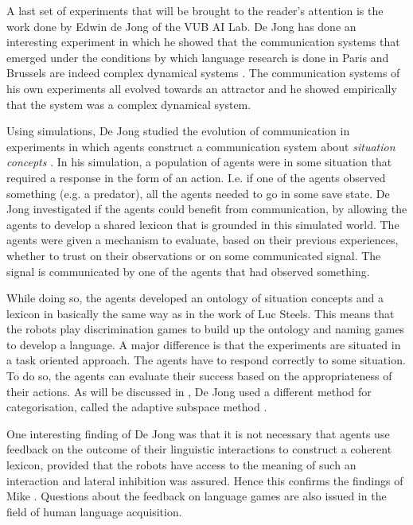 
A last set of experiments that will be brought to the reader's attention is the work done by Edwin de Jong of the VUB AI Lab. De Jong has done an interesting experiment in which he showed that the communication systems that emerged under the conditions by which language research is done in Paris and Brussels are indeed complex dynamical systems \citep{dejong:2000}. The communication systems of his own experiments all evolved towards an attractor and he showed empirically that the system was a complex dynamical system.

Using simulations, De Jong studied  the evolution of communication in experiments in which agents construct a communication system about {\em situation concepts} \citep{dejong:99b}. In his simulation, a population of agents were in some situation that required a response in the form of an action. I.e.  if one of the agents observed something (e.g. a predator), all the agents needed to go in some save state. De Jong investigated if the agents could benefit from communication, by allowing the agents to develop a shared lexicon that is grounded in this simulated world. The agents were given a mechanism to evaluate, based on their previous experiences, whether to trust on their observations or on some communicated signal. The signal is communicated by one of the agents that had observed something.

While doing so, the agents developed an ontology of situation concepts and a lexicon in basically the same way as in the work of Luc Steels. This means that the robots play discrimination games to build up the ontology and naming games to develop a language. A major difference is that the experiments are situated in a task oriented approach. The agents have to respond correctly to some situation. To do so, the agents can evaluate their success based on the appropriateness of their actions. As will be discussed in , De Jong used a different method for categorisation, called the {\sc adaptive subspace method} \citep{dejongvogt:1998}.

One interesting finding of De Jong was that it is not necessary that agents use feedback on the outcome of their linguistic interactions to construct a coherent lexicon, provided that the robots have access to the meaning of such an interaction and lateral inhibition was assured. Hence this confirms the findings of Mike \citet{oliphant:1998}. Questions about the feedback on language games are also issued in the field of human language acquisition.

